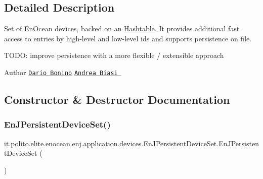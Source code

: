 \subsection{Detailed Description}
Set of En\+Ocean devices, backed on an \hyperlink{}{Hashtable}. It provides additional fast access to entries by high-\/level and low-\/level ids and supports persistence on file.

T\+O\+DO\+: improve persistence with a more flexible / extensible approach

\begin{DoxyAuthor}{Author}
\href{mailto:dario.bonino@gmail.com}{\tt Dario Bonino}  \href{mailto:biasiandrea04@gmail.com}{\tt Andrea Biasi } 
\end{DoxyAuthor}


\subsection{Constructor \& Destructor Documentation}
\hypertarget{classit_1_1polito_1_1elite_1_1enocean_1_1enj_1_1application_1_1devices_1_1_en_j_persistent_device_set_a6c30c67b0c3e54a3a0091cfb05df6232}{}\label{classit_1_1polito_1_1elite_1_1enocean_1_1enj_1_1application_1_1devices_1_1_en_j_persistent_device_set_a6c30c67b0c3e54a3a0091cfb05df6232} 
\subsubsection{\texorpdfstring{En\+J\+Persistent\+Device\+Set()}{EnJPersistentDeviceSet()}\hspace{0.1cm}{\footnotesize\ttfamily [1/2]}}
{\footnotesize\ttfamily it.\+polito.\+elite.\+enocean.\+enj.\+application.\+devices.\+En\+J\+Persistent\+Device\+Set.\+En\+J\+Persistent\+Device\+Set (\begin{DoxyParamCaption}{ }\end{DoxyParamCaption})}

\hypertarget{classit_1_1polito_1_1elite_1_1enocean_1_1enj_1_1application_1_1devices_1_1_en_j_persistent_device_set_aa69cd41d1ba054a8e06e9804af3d26d8}{}\label{classit_1_1polito_1_1elite_1_1enocean_1_1enj_1_1application_1_1devices_1_1_en_j_persistent_device_set_aa69cd41d1ba054a8e06e9804af3d26d8} 
